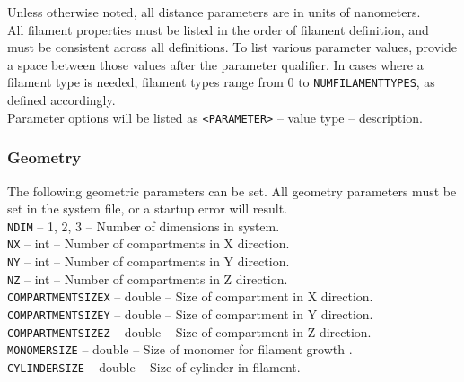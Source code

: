 \documentclass[11pt, oneside]{article}   	%
\begin{document}
 \noindent Unless otherwise noted, all distance parameters are in units of nanometers. \\

\noindent All filament properties must be listed in the order of filament definition, and must be consistent across all definitions. To list various parameter values, provide a space between those values after the parameter qualifier. In cases where a filament type is needed, filament types range from 0 to \texttt{NUMFILAMENTTYPES}, as defined accordingly. \\

\noindent Parameter options will be listed as \texttt{<PARAMETER>} -- value type -- description.


\subsubsection{Geometry}

The following geometric parameters can be set. All geometry parameters must be set in the system file, or a startup error will result. \\

\small 
\noindent \texttt{NDIM} -- 1, 2, 3 -- Number of dimensions in system. \\
 
\noindent \texttt{NX} -- int -- Number of compartments in X direction. \\

\noindent \texttt{NY} -- int -- Number of compartments in Y direction. \\

\noindent \texttt{NZ} -- int -- Number of compartments in Z direction. \\

\noindent \texttt{COMPARTMENTSIZEX} -- double -- Size of compartment in X direction. \\

\noindent \texttt{COMPARTMENTSIZEY} -- double -- Size of compartment in Y direction. \\

\noindent \texttt{COMPARTMENTSIZEZ} -- double -- Size of compartment in Z direction. \\

\noindent \texttt{MONOMERSIZE} -- double -- Size of monomer for filament growth .\\

\noindent \texttt{CYLINDERSIZE} -- double -- Size of cylinder in filament.\\
\end{document}
